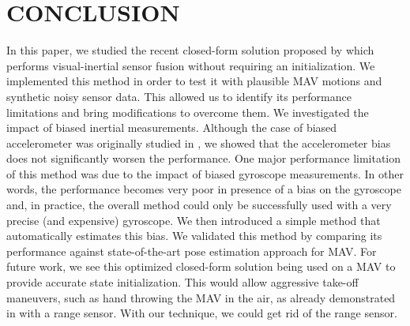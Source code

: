 \documentclass[letterpaper, 10 pt, conference]{ieeeconf}  %
\begin{document}



\section{CONCLUSION}\label{SectionConclusion}


In this paper, we studied the recent closed-form solution proposed by \cite{Martinelli2014} which performs visual-inertial sensor fusion without requiring an initialization.
We implemented this method in order to test it with plausible MAV motions and synthetic noisy sensor data.
This allowed us to identify its performance limitations and bring modifications to overcome them.
We investigated the impact of biased inertial measurements.
Although the case of biased accelerometer was originally studied in \cite{Martinelli2014}, we showed that the accelerometer bias does not significantly worsen the performance.
One major performance limitation of this method was due to the impact of biased gyroscope measurements.
In other words, the performance becomes very poor in presence of a bias on the gyroscope and, in practice, the overall method could only be successfully used with a very precise (and expensive) gyroscope.
We then introduced a simple method that automatically estimates this bias.
We validated this method by comparing its performance against state-of-the-art pose estimation approach for MAV.
For future work, we see this optimized closed-form solution being used on a MAV to provide accurate state initialization.
This would allow aggressive take-off maneuvers, such as hand throwing the MAV in the air, as already demonstrated in \cite{Faessler2015} with a range sensor.
With our technique, we could get rid of the range sensor.



\end{document}

